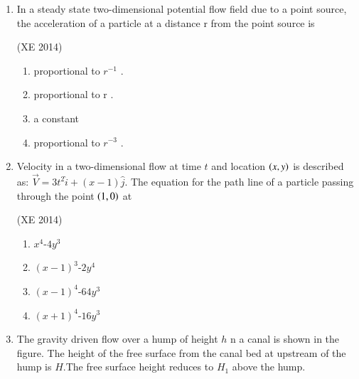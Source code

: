 \documentclass[journal,12pt,onecolumn]{IEEEtran}
\theoremstyle{remark}
\begin{document}
\begin{enumerate}
\item In a steady state two-dimensional potential flow field due to a point source, the acceleration of a
particle at a distance r from the point source is

\hfill{(XE 2014)}
\begin{multicols}{4}
\begin{enumerate}

\item proportional to $r^{-1}$ .
\item proportional to r .
\item a constant
\item proportional to $r^{-3}$ .

\end{enumerate}
\end{multicols}


\item Velocity in a two-dimensional flow at time $t$ and location $\left(x,y\right)$ is described as:
$\vec{V}=3t^{2}\hat{i}+(x-1)\hat{j}$. The equation for the path line of a particle passing through the point $\left(1,0\right)$ at

\hfill{(XE 2014)}
\begin{multicols}{4}
\begin{enumerate}

\item $x^{4}$-$4y^{3}$
\item $(x-1)^{3}$-$2y^{4}$
\item $(x-1)^{4}$-$64y^{3}$
\item $(x+1)^{4}$-$16y^{3}$

\end{enumerate}
\end{multicols}



\item The gravity driven flow over a hump of height $h$ n a canal is shown in the figure. The height of
the free surface from the canal bed at upstream of the hump is $H$.The free surface height reduces
to $H_1$ above the hump.



\end{enumerate}
\end{document}
